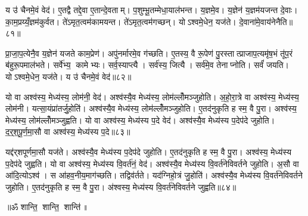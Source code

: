 य उ॑ चैनमे॒वं वेद॑। ए॒तद्वै तद्दे॒वा ए॒तान्दे॒वताम्। प॒शुम्भू॒तम्मेधा॒याल॑भन्त। य॒ज्ञमे॒व। य॒ज्ञेन॑ य॒ज्ञम॑यजन्त दे॒वाः। का॒म॒प्रय्यँ॒ज्ञम॑कुर्वत। ते॑ऽमृत॒त्वम॑कामयन्त। ते॑ऽमृत॒त्वम॑गच्छन्। योऽश्वमे॒धेन॒ यज॑ते। दे॒वाना॑मे॒वाय॑नेनैति॥८१॥

प्रा॒जा॒प॒त्येनै॒व य॒ज्ञेन॑ यजते काम॒प्रेण॑। अपु॑नर्मारमे॒व ग॑च्छति। ए॒तस्य॒ वै रू॒पेण॑ पु॒रस्तात्प्राजाप॒त्यमृ॑ष॒भं तू॑प॒रं ब॑हुरू॒पमाल॑भते। सर्वे॑भ्य॒ कामेभ्यः। सर्व॒स्याप्त्यै। सर्व॑स्य॒ जित्यै। सर्व॑मे॒व तेनाप्नोति। सर्वं॑ जयति। योऽश्वमे॒धेन॒ यज॑ते। य उ॑ चैनमे॒वं वेद॑॥८२॥\anuvakamend[मेधोऽभ॑व॒द्यज॑त एति॒ वेद॑]

यो वा अश्व॑स्य॒ मेध्य॑स्य॒ लोम॑नी॒ वेद॑। अश्व॑स्यै॒व मेध्य॑स्य॒ लोम॑ल्लोँमञ्जुहोति। अ॒हो॒रा॒त्रे वा अश्व॑स्य॒ मेध्य॑स्य॒ लोम॑नी। यत्सा॒यंप्रा॑तर्जु॒होति॑। अश्व॑स्यै॒व मेध्य॑स्य॒ लोम॑ल्लोँमञ्जुहोति। ए॒तद॑नुकृति ह स्म॒ वै पु॒रा। अश्व॑स्य॒ मेध्य॑स्य॒ लोम॑ल्लोँमञ्जुह्वति। यो वा अश्व॑स्य॒ मेध्य॑स्य प॒दे वेद॑। अश्व॑स्यै॒व मेध्य॑स्य प॒देप॑दे जुहोति। द॒र्॒श॒पू॒र्ण॒मा॒सौ वा अश्व॑स्य॒ मेध्य॑स्य प॒दे॥८३॥

यद्द॑र्‌शपूर्णमा॒सौ यज॑ते। अश्व॑स्यै॒व मेध्य॑स्य प॒देप॑दे जुहोति। ए॒तद॑नुकृति ह स्म॒ वै पु॒रा। अश्व॑स्य॒ मेध्य॑स्य प॒देप॑दे जुह्वति। यो वा अश्व॑स्य॒ मेध्य॑स्य वि॒वर्त॑नं॒ वेद॑। अश्व॑स्यै॒व मेध्य॑स्य वि॒वर्त॑नेविवर्तने जुहोति। अ॒सौ वा आ॑दि॒त्योऽश्व॑। स आ॑हव॒नीय॒माग॑च्छति। तद्विव॑र्तते। यद॑ग्निहो॒त्रं जु॒होति॑। अश्व॑स्यै॒व मेध्य॑स्य वि॒वर्त॑नेविवर्तने जुहोति। ए॒तद॑नुकृति ह स्म॒ वै पु॒रा। अ॑श्वस्य॒ मेध्य॑स्य वि॒वर्त॑नेविवर्तने जुह्वति॥८४॥\anuvakamend[प॒दे अ॑ग्निहो॒त्रं जु॒होति॒ त्रीणि॑ च]

\centerline{॥ॐ शान्ति॒ शान्ति॒ शान्ति॑॥}

